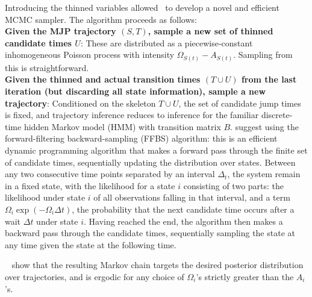 Introducing the thinned variables allowed~\cite{RaoTeh13} to develop
a novel and efficient MCMC sampler. The algorithm proceeds as follows:\\
\textbf{Given the MJP trajectory $(S,T)$, sample a new set of thinned 
candidate times $U$}: %
These are distributed as a piecewise-constant inhomogeneous Poisson process
with intensity $\Omega_{S(t)}-A_{S(t)}$. Sampling from this is
straightforward.\\
\textbf{Given the thinned and actual transition times $(T \cup U)$
from the last iteration (but discarding all state information), 
sample a new trajectory}:
    Conditioned on the skeleton $T \cup U$, the set of candidate jump
    times is fixed, and trajectory inference reduces to inference for
    the familiar discrete-time hidden Markov model (HMM) with transition
    matrix $B$. \cite{RaoTeh13} suggest using the forward-filtering
    backward-sampling (FFBS) algorithm: this is an efficient dynamic 
    programming algorithm that makes a forward pass through the
    finite set of candidate times, sequentially updating the 
    distribution over states. 
    Between any two consecutive time points separated by an interval
    $\Delta_t$, the system
    remain in a fixed state, with the likelihood for a state $i$ consisting
    of two parts: the likelihood under state $i$ of all observations 
    falling in that interval, and a term $\Omega_i\exp(-\Omega_i\Delta t)$,
    the probability that the next candidate time occurs after a wait
    $\Delta t$ under state $i$.
    Having reached the end, the algorithm then
    makes a backward pass through the candidate times, sequentially
    sampling the state at any time given the state at the following
    time. 

    ~\cite{RaoTeh12} show that the resulting Markov chain targets
    the desired posterior distribution over trajectories, and is 
    ergodic for any choice of $\Omega_i$'s strictly greater than the
    $A_i$'s.

